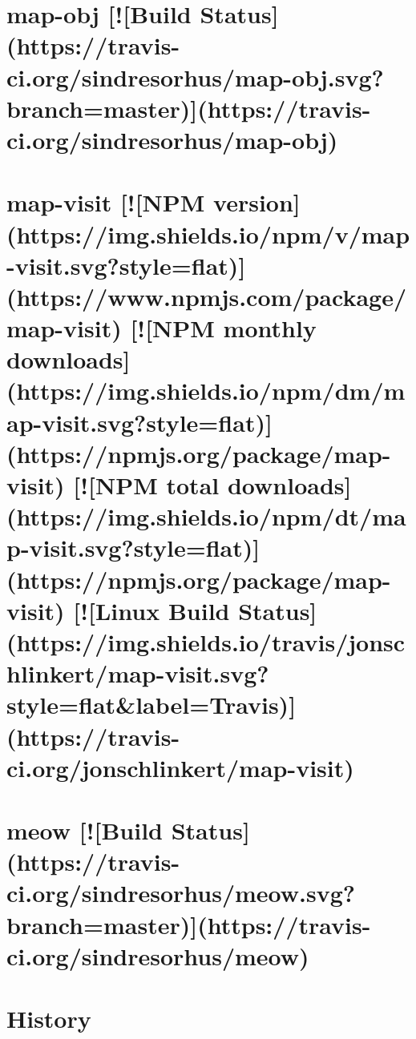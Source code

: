\documentclass[twoside]{book}
\newcommand{\+}{\discretionary{\mbox{\scriptsize$\hookleftarrow$}}{}{}}
\begin{document}
\chapter{map-\/obj \mbox{[}!\mbox{[}Build Status\mbox{]}(https\+://travis-\/ci.org/sindresorhus/map-\/obj.svg?branch=master)\mbox{]}(https\+://travis-\/ci.org/sindresorhus/map-\/obj)}
\label{md_dsmacc_vis_degree_node_modules_map-obj_readme}

\chapter{map-\/visit \mbox{[}!\mbox{[}N\+PM version\mbox{]}(https\+://img.shields.\+io/npm/v/map-\/visit.svg?style=flat)\mbox{]}(https\+://www.npmjs.\+com/package/map-\/visit) \mbox{[}!\mbox{[}N\+PM monthly downloads\mbox{]}(https\+://img.shields.\+io/npm/dm/map-\/visit.svg?style=flat)\mbox{]}(https\+://npmjs.org/package/map-\/visit) \mbox{[}!\mbox{[}N\+PM total downloads\mbox{]}(https\+://img.shields.\+io/npm/dt/map-\/visit.svg?style=flat)\mbox{]}(https\+://npmjs.org/package/map-\/visit) \mbox{[}!\mbox{[}Linux Build Status\mbox{]}(https\+://img.shields.\+io/travis/jonschlinkert/map-\/visit.svg?style=flat\&label=Travis)\mbox{]}(https\+://travis-\/ci.org/jonschlinkert/map-\/visit)}
\label{md_dsmacc_vis_degree_node_modules_map-visit_README}

\chapter{meow \mbox{[}!\mbox{[}Build Status\mbox{]}(https\+://travis-\/ci.org/sindresorhus/meow.svg?branch=master)\mbox{]}(https\+://travis-\/ci.org/sindresorhus/meow)}
\label{md_dsmacc_vis_degree_node_modules_meow_readme}

\chapter{History}
\label{md_dsmacc_vis_degree_node_modules_micromatch_CHANGELOG}

\end{document}
